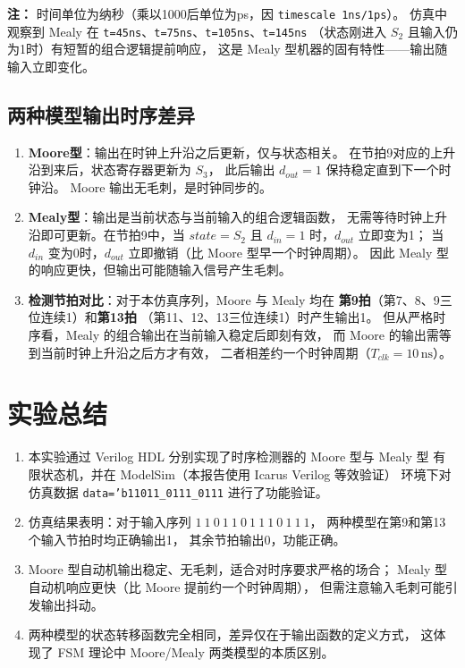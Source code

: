 \documentclass[12pt,a4paper]{article}
\begin{document}
\textbf{注：} 时间单位为纳秒（乘以1000后单位为ps，因 \texttt{timescale 1ns/1ps}）。
仿真中观察到 Mealy 在 \texttt{t=45ns}、\texttt{t=75ns}、\texttt{t=105ns}、\texttt{t=145ns}
（状态刚进入 $S_2$ 且输入仍为1时）有短暂的组合逻辑提前响应，
这是 Mealy 型机器的固有特性——输出随输入立即变化。

\subsection{两种模型输出时序差异}

\begin{enumerate}
  \item \textbf{Moore型}：输出在时钟上升沿之后更新，仅与状态相关。
        在节拍9对应的上升沿到来后，状态寄存器更新为 $S_3$，
        此后输出 $d_{out}=1$ 保持稳定直到下一个时钟沿。
        Moore 输出无毛刺，是时钟同步的。

  \item \textbf{Mealy型}：输出是当前状态与当前输入的组合逻辑函数，
        无需等待时钟上升沿即可更新。在节拍9中，当 $state=S_2$
        且 $d_{in}=1$ 时，$d_{out}$ 立即变为1；
        当 $d_{in}$ 变为0时，$d_{out}$ 立即撤销（比 Moore 型早一个时钟周期）。
        因此 Mealy 型的响应更快，但输出可能随输入信号产生毛刺。

  \item \textbf{检测节拍对比}：对于本仿真序列，Moore 与 Mealy 均在
        \textbf{第9拍}（第7、8、9三位连续1）和\textbf{第13拍}
        （第11、12、13三位连续1）时产生输出1。
        但从严格时序看，Mealy 的组合输出在当前输入稳定后即刻有效，
        而 Moore 的输出需等到当前时钟上升沿之后方才有效，
        二者相差约一个时钟周期（$T_{clk} = 10\,\text{ns}$）。
\end{enumerate}

\section{实验总结}

\begin{enumerate}
  \item 本实验通过 Verilog HDL 分别实现了时序检测器的 Moore 型与 Mealy 型
        有限状态机，并在 ModelSim（本报告使用 Icarus Verilog 等效验证）
        环境下对仿真数据 \texttt{data='b11011\_0111\_0111} 进行了功能验证。

  \item 仿真结果表明：对于输入序列 $1\ 1\ 0\ 1\ 1\ 0\ 1\ 1\ 1\ 0\ 1\ 1\ 1$，
        两种模型在第9和第13个输入节拍时均正确输出1，
        其余节拍输出0，功能正确。

  \item Moore 型自动机输出稳定、无毛刺，适合对时序要求严格的场合；
        Mealy 型自动机响应更快（比 Moore 提前约一个时钟周期），
        但需注意输入毛刺可能引发输出抖动。

  \item 两种模型的状态转移函数完全相同，差异仅在于输出函数的定义方式，
        这体现了 FSM 理论中 Moore/Mealy 两类模型的本质区别。
\end{enumerate}
\end{document}

